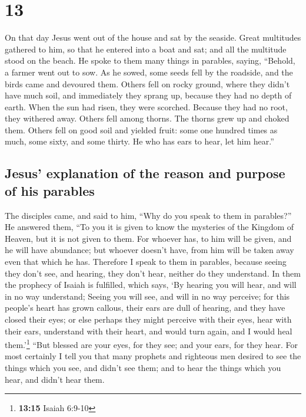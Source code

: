\hypertarget{section-12}{%
\section{13}\label{section-12}}

 On that day Jesus went out of the house and sat by the
seaside.  Great multitudes gathered to him, so that he
entered into a boat and sat; and all the multitude stood on the beach.
 He spoke to them many things in parables, saying,
``Behold, a farmer went out to sow.  As he sowed, some
seeds fell by the roadside, and the birds came and devoured them.
 Others fell on rocky ground, where they didn't have much
soil, and immediately they sprang up, because they had no depth of
earth.  When the sun had risen, they were scorched.
Because they had no root, they withered away.  Others fell
among thorns. The thorns grew up and choked them.  Others
fell on good soil and yielded fruit: some one hundred times as much,
some sixty, and some thirty.  He who has ears to hear, let
him hear.''

\hypertarget{jesus-explanation-of-the-reason-and-purpose-of-his-parables}{%
\subsection{Jesus' explanation of the reason and purpose of his
parables}\label{jesus-explanation-of-the-reason-and-purpose-of-his-parables}}

 The disciples came, and said to him, ``Why do you speak
to them in parables?''  He answered them, ``To you it is
given to know the mysteries of the Kingdom of Heaven, but it is not
given to them.  For whoever has, to him will be given,
and he will have abundance; but whoever doesn't have, from him will be
taken away even that which he has.  Therefore I speak to
them in parables, because seeing they don't see, and hearing, they don't
hear, neither do they understand.  In them the prophecy
of Isaiah is fulfilled, which says, `By hearing you will hear, and will
in no way understand; Seeing you will see, and will in no way perceive;
 for this people's heart has grown callous, their ears
are dull of hearing, and they have closed their eyes; or else perhaps
they might perceive with their eyes, hear with their ears, understand
with their heart, and would turn again, and I would heal
them.'\footnote{\textbf{13:15} Isaiah 6:9-10}  ``But
blessed are your eyes, for they see; and your ears, for they hear.
 For most certainly I tell you that many prophets and
righteous men desired to see the things which you see, and didn't see
them; and to hear the things which you hear, and didn't hear them.

